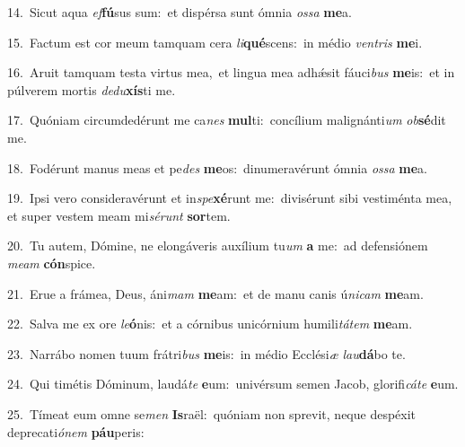 {\numbfont\textcolor{\numbcolor}{14.}}~Sicut aqua \textit{ef}\-\textbf{fú}sus sum:~\star et dispérsa sunt ómnia \textit{os}\-\textit{sa} \textbf{me}\-a.\par
{\numbfont\textcolor{\numbcolor}{15.}}~Factum est cor meum tamquam cera \textit{li}\-\textbf{qué}scens:~\star in médio \textit{ven}\-\textit{tris} \textbf{me}\-i.\par
{\numbfont\textcolor{\numbcolor}{16.}}~Aruit tamquam testa virtus mea,~\dagger et lingua mea adhǽsit fáuci\textit{bus} \textbf{me}\-is:~\star et in púlverem mortis \textit{de}\-\textit{du}\textbf{xís}ti me.\par
{\numbfont\textcolor{\numbcolor}{17.}}~Quóniam circumdedérunt me ca\textit{nes} \textbf{mul}\-ti:~\star concílium malignánti\textit{um} \textit{ob}\-\textbf{sé}dit me.\par
{\numbfont\textcolor{\numbcolor}{18.}}~Fodérunt manus meas et pe\textit{des} \textbf{me}\-os:~\star dinumeravérunt ómnia \textit{os}\-\textit{sa} \textbf{me}\-a.\par
{\numbfont\textcolor{\numbcolor}{19.}}~Ipsi vero consideravérunt et in\-\textit{spe}\-\textbf{xé}runt me:~\star divisérunt sibi vestiménta mea, et super vestem meam mi\-\textit{sé}\-\textit{runt} \textbf{sor}\-tem.\par
{\numbfont\textcolor{\numbcolor}{20.}}~Tu autem, Dómine, ne elongáveris auxílium tu\textit{um} \textbf{a} me:~\star ad defensiónem \textit{me}\-\textit{am} \textbf{cón}\-spice.\par
{\numbfont\textcolor{\numbcolor}{21.}}~Erue a frámea, Deus, áni\textit{mam} \textbf{me}\-am:~\star et de manu canis ú\-\textit{ni}\-\textit{cam} \textbf{me}\-am.\par
{\numbfont\textcolor{\numbcolor}{22.}}~Salva me ex ore \textit{le}\-\textbf{ó}nis:~\star et a córnibus unicórnium humili\-\textit{tá}\-\textit{tem} \textbf{me}\-am.\par
{\numbfont\textcolor{\numbcolor}{23.}}~Narrábo nomen tuum frátri\textit{bus} \textbf{me}\-is:~\star in médio Ecclési\textit{æ} \textit{lau}\-\textbf{dá}bo te.\par
{\numbfont\textcolor{\numbcolor}{24.}}~Qui timétis Dóminum, laudá\textit{te} \textbf{e}\-um:~\star univérsum semen Jacob, glorifi\-\textit{cá}\-\textit{te} \textbf{e}\-um.\par
{\numbfont\textcolor{\numbcolor}{25.}}~Tímeat eum omne se\textit{men} \textbf{Is}\-raël:~\star quóniam non sprevit, neque despéxit deprecati\-\textit{ó}\-\textit{nem} \textbf{páu}\-peris:\par
